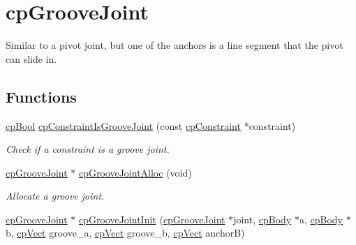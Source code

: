\hypertarget{group__cp_groove_joint}{}\section{cp\+Groove\+Joint}
\label{group__cp_groove_joint}


Similar to a pivot joint, but one of the anchors is a line segment that the pivot can slide in.  


\subsection*{Functions}
\begin{DoxyCompactItemize}
\item 
\hypertarget{group__cp_groove_joint_ga60d3e0fc171d82303d75bb911511cec5}{}\hyperlink{group__basic_types_gabc5e752c48f3449ca26ef413ecbd647e}{cp\+Bool} \hyperlink{group__cp_groove_joint_ga60d3e0fc171d82303d75bb911511cec5}{cp\+Constraint\+Is\+Groove\+Joint} (const \hyperlink{structcp_constraint}{cp\+Constraint} $\ast$constraint)\label{group__cp_groove_joint_ga60d3e0fc171d82303d75bb911511cec5}

\begin{DoxyCompactList}\small\item\em Check if a constraint is a groove joint. \end{DoxyCompactList}\item 
\hypertarget{group__cp_groove_joint_ga019749a30c1717dda8166c55ea99c0d0}{}\hyperlink{structcp_groove_joint}{cp\+Groove\+Joint} $\ast$ \hyperlink{group__cp_groove_joint_ga019749a30c1717dda8166c55ea99c0d0}{cp\+Groove\+Joint\+Alloc} (void)\label{group__cp_groove_joint_ga019749a30c1717dda8166c55ea99c0d0}

\begin{DoxyCompactList}\small\item\em Allocate a groove joint. \end{DoxyCompactList}\item 
\hypertarget{group__cp_groove_joint_gabb45811c0a7daf98ac10e8c9b26c7a5a}{}\hyperlink{structcp_groove_joint}{cp\+Groove\+Joint} $\ast$ \hyperlink{group__cp_groove_joint_gabb45811c0a7daf98ac10e8c9b26c7a5a}{cp\+Groove\+Joint\+Init} (\hyperlink{structcp_groove_joint}{cp\+Groove\+Joint} $\ast$joint, \hyperlink{structcp_body}{cp\+Body} $\ast$a, \hyperlink{structcp_body}{cp\+Body} $\ast$b, \hyperlink{structcp_vect}{cp\+Vect} groove\+\_\+a, \hyperlink{structcp_vect}{cp\+Vect} groove\+\_\+b, \hyperlink{structcp_vect}{cp\+Vect} anchor\+B)\label{group__cp_groove_joint_gabb45811c0a7daf98ac10e8c9b26c7a5a}


\end{DoxyCompactItemize}
